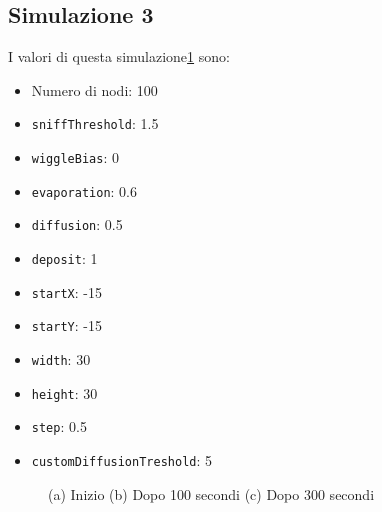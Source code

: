 \subsection{Simulazione 3}\label{sim3}
I valori di questa simulazione\space \cref{fig:sim3} sono:
\begin{itemize}
    \item Numero di nodi: 100
    \item \texttt{sniffThreshold}: 1.5
    \item \texttt{wiggleBias}: 0
    \item \texttt{evaporation}: 0.6
    \item \texttt{diffusion}: 0.5
    \item \texttt{deposit}: 1
    \item \texttt{startX}: -15
    \item \texttt{startY}: -15
    \item \texttt{width}: 30
    \item \texttt{height}: 30
    \item \texttt{step}: 0.5
    \item \texttt{customDiffusionTreshold}: 5
\end{itemize}
\begin{figure}[p]
    \centering
    \caption{(a) Inizio (b) Dopo 100 secondi (c) Dopo 300 secondi}\label{fig:sim3}
\end{figure}

